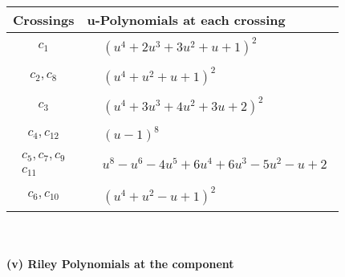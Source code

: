 \documentclass[1p]{elsarticle_modified}
\theoremstyle{definition}
\begin{document}
\begin{tabular}{m{50pt}|m{274pt}}
Crossings & \hspace{64pt}u-Polynomials at each crossing \\
\hline $$\begin{aligned}c_{1}\end{aligned}$$&$\begin{aligned}
&(u^4+2 u^3+3 u^2+u+1)^2
\end{aligned}$\\
\hline $$\begin{aligned}c_{2},c_{8}\end{aligned}$$&$\begin{aligned}
&(u^4+u^2+u+1)^2
\end{aligned}$\\
\hline $$\begin{aligned}c_{3}\end{aligned}$$&$\begin{aligned}
&(u^4+3 u^3+4 u^2+3 u+2)^2
\end{aligned}$\\
\hline $$\begin{aligned}c_{4},c_{12}\end{aligned}$$&$\begin{aligned}
&(u-1)^8
\end{aligned}$\\
\hline $$\begin{aligned}c_{5},c_{7},c_{9}\\c_{11}\end{aligned}$$&$\begin{aligned}
&u^8- u^6-4 u^5+6 u^4+6 u^3-5 u^2- u+2
\end{aligned}$\\
\hline $$\begin{aligned}c_{6},c_{10}\end{aligned}$$&$\begin{aligned}
&(u^4+u^2- u+1)^2
\end{aligned}$\\
\hline
\end{tabular}\\~\\
\newpage\renewcommand{\arraystretch}{1}
\flushleft \textbf{(v) Riley Polynomials at the component}\newline \\
\end{document}
